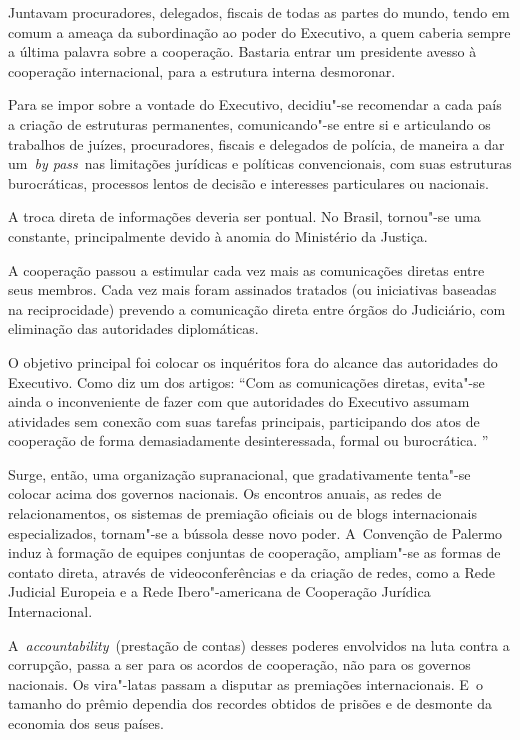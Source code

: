 Juntavam procuradores, delegados, fiscais de todas as partes do mundo,
tendo em comum a ameaça da subordinação ao poder do Executivo, a quem
caberia sempre a última palavra sobre a cooperação. Bastaria entrar um
presidente avesso à cooperação internacional, para a estrutura interna
desmoronar.

Para se impor sobre a vontade do Executivo, decidiu"-se recomendar a cada
país a criação de estruturas permanentes, comunicando"-se entre si e
articulando os trabalhos de juízes, procuradores, fiscais e delegados de
polícia, de maneira a dar um~\emph{by pass}~nas limitações jurídicas e
políticas convencionais, com suas estruturas burocráticas, processos
lentos de decisão e interesses particulares ou nacionais.

A troca direta de informações deveria ser pontual. No Brasil, tornou"-se
uma constante, principalmente devido à anomia do Ministério da Justiça.

A cooperação passou a estimular cada vez mais as comunicações diretas
entre seus membros. Cada vez mais foram assinados tratados (ou
iniciativas baseadas na reciprocidade) prevendo a comunicação direta
entre órgãos do Judiciário, com eliminação das autoridades diplomáticas.

O objetivo principal foi colocar os inquéritos fora do alcance das
autoridades do Executivo. Como diz um dos artigos: ``Com as comunicações
diretas, evita"-se ainda o inconveniente de fazer com que autoridades do
Executivo assumam atividades sem conexão com suas tarefas principais,
participando dos atos de cooperação de forma demasiadamente
desinteressada, formal ou burocrática. ''

Surge, então, uma organização supranacional, que gradativamente tenta"-se
colocar acima dos governos nacionais. Os encontros anuais, as redes de
relacionamentos, os sistemas de premiação oficiais ou de blogs
internacionais especializados, tornam"-se a bússola desse novo poder. A~Convenção de Palermo induz à formação de equipes conjuntas de
cooperação, ampliam"-se as formas de contato direta, através de
videoconferências e da criação de redes, como a Rede Judicial Europeia e
a Rede Ibero"-americana de Cooperação Jurídica Internacional.

A~\emph{accountability}~(prestação de contas) desses poderes envolvidos
na luta contra a corrupção, passa a ser para os acordos de cooperação,
não para os governos nacionais. Os vira"-latas passam a disputar as
premiações internacionais. E~o tamanho do prêmio dependia dos recordes
obtidos de prisões e de desmonte da economia dos seus países.

